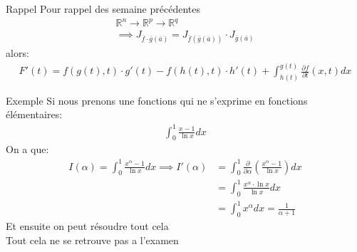 \begin{parag}{Rappel}
    Pour rappel des semaine précédentes
    \begin{align*}
       \mathbb{R}^n  \to \mathbb{R}^p \to \mathbb{R}^q \\
       \implies J_{ \overline{f} \cdot \overline{g}( \overline{a})} = J_{ \overline{f} ( \overline{g} ( \overline{a}))} \cdot J_{ \overline{g} ( \overline{a})}
    \end{align*}
alors:
\begin{align*}
    F'(t) = f(g(t), t) \cdot g'(t) - f(h(t), t) \cdot h'(t) + \int_{h(t)}^{g(t)} \frac{\partial f}{\partial t}( x, t)dx
\end{align*}

\begin{subparag}{Exemple}
    Si nous prenons une fonctions qui ne s'exprime en fonctions élémentaires:
    \begin{align*}
        \int_0^1 \frac{x - 1}{ \ln x} dx
    \end{align*}
    On a que:
    \begin{align*}
        I( \alpha) = \int_0^1 \frac{x^\alpha - 1}{\ln x} dx \implies I'( \alpha) &= \int_0^1 \frac{\partial}{\partial \alpha} ( \frac{x^{ \alpha} - 1}{ \ln x}) dx \\
                   &= \int_0^1 \frac{x^\alpha \cdot \ln x}{\ln x} dx \\
                   &= \int_0^1 x^{ \alpha} dx = \frac{1}{ \alpha + 1}
    \end{align*}
    Et ensuite on peut résoudre tout cela\\
    Tout cela ne se retrouve pas a l'examen
\end{subparag}

\end{parag}


